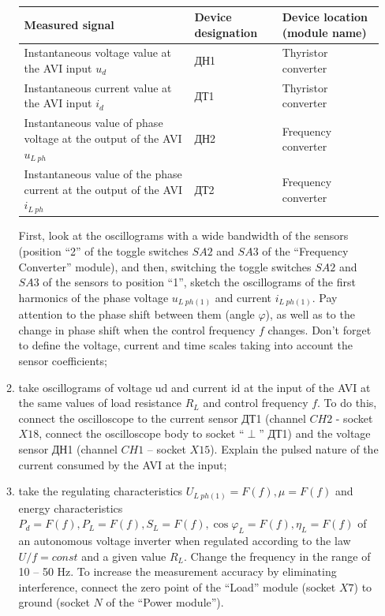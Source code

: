 \documentclass[a4paper,14pt]{article}
\begin{document}
\begin{enumerate}
\begin{enumerate}
\begin{table}[!ht]
\begin{tabular}{p{}p{}p{}}
\toprule
Measured signal& Device designation& Device location (module name)\\
\midrule
Instantaneous voltage value at the AVI input $u_d$ & ДН1 & Thyristor converter\\
\midrule
Instantaneous current value at the AVI input $i_d$ & ДТ1 & Thyristor converter\\
\midrule
Instantaneous value of phase voltage at the output of the AVI $u_{L\:ph}$ & ДН2 & Frequency converter \\
\midrule
Instantaneous value of the phase current at the output of the AVI $i_{L\:ph}$ & ДТ2 & Frequency converter 
\end{tabular}
\caption{}
\label{table:III}
\end{table}

First, look at the oscillograms with a wide bandwidth of the sensors (position “2” of the toggle switches $SA2$ and $SA3$ of the “Frequency Converter” module), and then, switching the toggle switches $SA2$ and $SA3$ of the sensors to position “1”, sketch the oscillograms of the first harmonics of the phase voltage $u_{L\:ph(1)}$ and current $i_{L\:ph(1)}$. 
Pay attention to the phase shift between them (angle $\varphi$), as well as to the change in phase shift when the control frequency $f$ changes. 
Don't forget to define the voltage, current and time scales taking into account the sensor coefficients;

\item take oscillograms of voltage ud and current id at the input of the AVI at the same values of load resistance $R_L$ and control frequency $f$. 
To do this, connect the oscilloscope to the current sensor ДТ1 (channel $CH2$ - socket $X18$, connect the oscilloscope body to socket “$\perp$” ДТ1) and the voltage sensor ДН1 (channel $CH1$ -- socket $X15$). 
Explain the pulsed nature of the current consumed by the AVI at the input;

\item \label{enum:regul} take the regulating characteristics %
 $U_{L\:ph(1)} = F(f), \mu = F(f)$ and energy characteristics $P_d = F(f), P_L = F(f), S_L = F(f),\cos\varphi_L = F(f), \eta_L = F(f)$ of an autonomous voltage inverter when regulated according to the law $U/f=const$ and a given value $R_L$. Change the frequency in the range of 10 -- 50 Hz. To increase the measurement accuracy by eliminating interference, connect the zero point of the “Load” module (socket $X7$) to ground (socket $N$ of the “Power module”).


\end{enumerate}
\end{enumerate}
\end{document}
